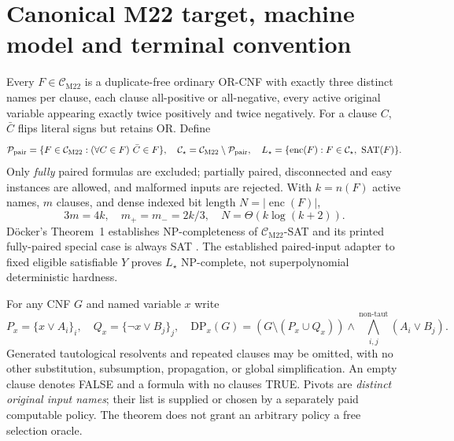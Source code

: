 \documentclass[11pt]{article}
\newcommand{\CM}{\mathcal C_{\mathrm{M22}}}
\newcommand{\CS}{\mathcal C_\star}
\newcommand{\SAT}{\operatorname{SAT}}
\begin{document}
\section{Canonical M22 target, machine model and terminal convention}
Every $F\in\CM$ is a duplicate-free ordinary OR-CNF with exactly three distinct names per clause, each clause all-positive or all-negative, every active original variable appearing exactly twice positively and twice negatively. For a clause $C$, $\bar C$ flips literal signs but retains OR. Define
\[
\mathcal P_{\rm pair}=\{F\in\CM:(\forall C\in F)\ \bar C\in F\},\quad
\CS=\CM\setminus\mathcal P_{\rm pair},\quad
L_\star=\{\operatorname{enc}(F):F\in\CS,\ \SAT(F)\}.
\]
Only \emph{fully} paired formulas are excluded; partially paired, disconnected and easy instances are allowed, and malformed inputs are rejected. With $k=n(F)$ active names, $m$ clauses, and dense indexed bit length $N=|\operatorname{enc}(F)|$,
\[
3m=4k,\quad m_+=m_-=2k/3,\quad N=\Theta(k\log(k+2)).
\]
D\"ocker's Theorem~1 establishes NP-completeness of $\CM$-SAT and its printed fully-paired special case is always SAT \cite{docker}. The established paired-input adapter to fixed eligible satisfiable $Y$ proves $L_\star$ NP-complete, not superpolynomial deterministic hardness.

For any CNF $G$ and named variable $x$ write
\[
P_x=\{x\lor A_i\}_i,\quad Q_x=\{\neg x\lor B_j\}_j,\quad
\mathrm{DP}_x(G)=(G\setminus(P_x\cup Q_x))\wedge
 \bigwedge_{i,j}^{\mathrm{non\text{-}taut}}(A_i\lor B_j).
\]
Generated tautological resolvents and repeated clauses may be omitted, with no other substitution, subsumption, propagation, or global simplification. An empty clause denotes FALSE and a formula with no clauses TRUE. Pivots are \emph{distinct original input names}; their list is supplied or chosen by a separately paid computable policy. The theorem does not grant an arbitrary policy a free selection oracle.
\end{document}
